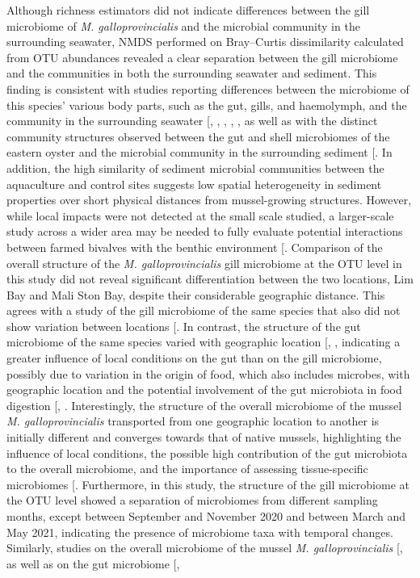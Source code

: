 \documentclass[
  12 pt,
]{article}
\begin{document}
Although richness estimators did not indicate differences between the gill microbiome of \emph{M. galloprovincialis} and the microbial community in the surrounding seawater, NMDS performed on Bray--Curtis dissimilarity calculated from OTU abundances revealed a clear separation between the gill microbiome and the communities in both the surrounding seawater and sediment. This finding is consistent with studies reporting differences between the microbiome of this species' various body parts, such as the gut, gills, and haemolymph, and the community in the surrounding seawater {[}, , , , \citeproc{ref-Zardinoni2024}{31}{]}, as well as with the distinct community structures observed between the gut and shell microbiomes of the eastern oyster and the microbial community in the surrounding sediment {[}\citeproc{ref-Arfken2017}{12}{]}. In addition, the high similarity of sediment microbial communities between the aquaculture and control sites suggests low spatial heterogeneity in sediment properties over short physical distances from mussel-growing structures. However, while local impacts were not detected at the small scale studied, a larger-scale study across a wider area may be needed to fully evaluate potential interactions between farmed bivalves with the benthic environment {[}\citeproc{ref-Tong2025}{99}{]}. Comparison of the overall structure of the \emph{M. galloprovincialis} gill microbiome at the OTU level in this study did not reveal significant differentiation between the two locations, Lim Bay and Mali Ston Bay, despite their considerable geographic distance. This agrees with a study of the gill microbiome of the same species that also did not show variation between locations {[}\citeproc{ref-Zardinoni2024}{31}{]}. In contrast, the structure of the gut microbiome of the same species varied with geographic location {[}, \citeproc{ref-Palladino2023}{28}{]}, indicating a greater influence of local conditions on the gut than on the gill microbiome, possibly due to variation in the origin of food, which also includes microbes, with geographic location and the potential involvement of the gut microbiota in food digestion {[}, \citeproc{ref-Gosling2003c}{96}{]}. Interestingly, the structure of the overall microbiome of the mussel \emph{M. galloprovincialis} transported from one geographic location to another is initially different and converges towards that of native mussels, highlighting the influence of local conditions, the possible high contribution of the gut microbiota to the overall microbiome, and the importance of assessing tissue-specific microbiomes {[}\citeproc{ref-Peruzzo2026}{23}{]}. Furthermore, in this study, the structure of the gill microbiome at the OTU level showed a separation of microbiomes from different sampling months, except between September and November 2020 and between March and May 2021, indicating the presence of microbiome taxa with temporal changes. Similarly, studies on the overall microbiome of the mussel \emph{M. galloprovincialis} {[}\citeproc{ref-Peruzzo2026}{23}{]}, as well as on the gut microbiome {[}, 
\end{document}
